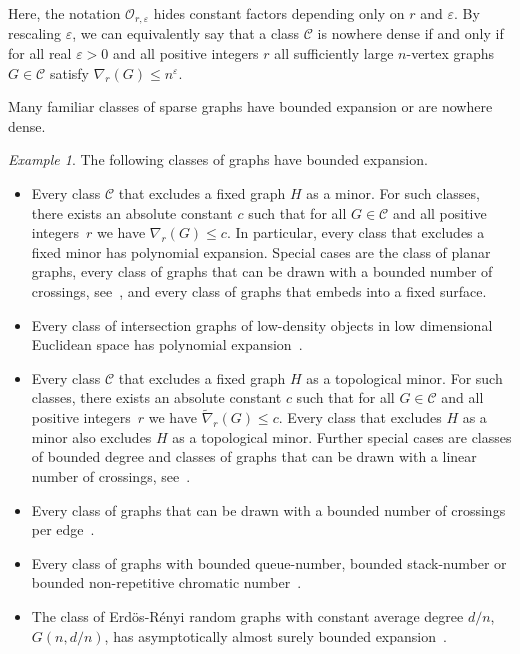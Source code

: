 \documentclass[1p,number,a4paper]{elsarticle}
\theoremstyle{remark}
\newcommand{\Oof}{\mathcal{O}}
\newcommand{\CCC}{\mathscr{C}}
\newcommand{\Cc}{\mathscr{C}}
\renewcommand{\epsilon}{\varepsilon}
\newtheorem{example}[theorem]{Example}
\begin{document}
Here, the notation $\Oof_{r,\epsilon}$ hides constant factors depending only on $r$ and $\epsilon$. By rescaling $\epsilon$, we can equivalently say that a class $\Cc$ is nowhere dense if and only if for all real
$\epsilon>0$ and all positive integers $r$ all sufficiently large
$n$-vertex graphs $G\in\CCC$ satisfy
$\nabla_r(G)\leq n^\epsilon$.  

\medskip
Many familiar classes of sparse graphs have bounded expansion
or are nowhere dense. 

\begin{example}
The following classes of graphs have bounded expansion.
\begin{itemize}
\item Every class $\Cc$ that excludes a fixed graph $H$ as
a minor. For such classes, there exists an absolute constant
$c$ such that for all $G\in\Cc$ and all positive integers~$r$ 
we have $\nabla_r(G)\leq c$. In particular, every class that
excludes a fixed minor has polynomial expansion. 
Special cases are the class of
planar graphs, every class of graphs that can be drawn 
with a bounded number of crossings, see~\cite{nevsetvril2012characterisations}, and every class of graphs
that embeds into a fixed surface. 
\item Every class of intersection graphs of low-density objects in low 
dimensional Euclidean space has polynomial expansion~\cite{har2017approximation}. 
\item Every class $\Cc$ that excludes a fixed graph $H$ as
a topological minor. For such classes, there exists an absolute constant
$c$ such that for all $G\in\Cc$ and all positive integers~$r$ 
we have $\widetilde\nabla_r(G)\leq c$. Every class that 
excludes $H$ as a minor also excludes $H$ as a topological 
minor. Further special cases are classes of bounded degree
and classes of graphs that can be drawn 
with a linear number of crossings, see~\cite{nevsetvril2012characterisations}. 
\item Every class of graphs that can be drawn with a bounded 
number of crossings per edge~\cite{nevsetvril2012characterisations}. 
\item Every class of graphs with bounded queue-number, 
bounded stack-number or bounded non-repetitive chromatic number~\cite{nevsetvril2012characterisations}. 
\item The class of Erd\"os-R\'enyi random graphs with 
constant average degree $d/n$, $G(n,d/n)$, has 
asymptotically almost surely bounded expansion~\cite{nevsetvril2012characterisations}. 
\end{itemize}
\end{example}
\end{document}
